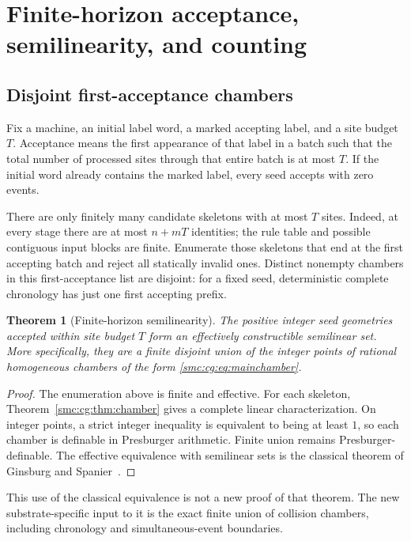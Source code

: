 \documentclass[11pt,letterpaper]{article}
\numberwithin{equation}{section}
\newtheorem{theorem}{Theorem}[section]
\theoremstyle{definition}
\theoremstyle{remark}
\begin{document}
\section{Finite-horizon acceptance, semilinearity, and counting}
\label{smc:cg:sec:counting}

\subsection{Disjoint first-acceptance chambers}

Fix a machine, an initial label word, a marked accepting label, and a site
budget $T$. Acceptance means the first appearance of that label in a batch
such that the total number of processed sites through that entire batch is
at most $T$. If the initial word already contains the marked label, every
seed accepts with zero events.

There are only finitely many candidate skeletons with at most $T$ sites.
Indeed, at every stage there are at most $n+mT$ identities; the rule table
and possible contiguous input blocks are finite. Enumerate those skeletons
that end at the first accepting batch and reject all statically invalid
ones. Distinct nonempty chambers in this first-acceptance list are disjoint:
for a fixed seed, deterministic complete chronology has just one first
accepting prefix.

\begin{theorem}[Finite-horizon semilinearity]
\label{smc:cg:thm:semilinear}
The positive integer seed geometries accepted within site budget $T$ form
an effectively constructible semilinear set. More specifically, they are a
finite disjoint union of the integer points of rational homogeneous
chambers of the form \eqref{smc:cg:eq:mainchamber}.
\end{theorem}
\begin{proof}
The enumeration above is finite and effective. For each skeleton,
Theorem~\ref{smc:cg:thm:chamber} gives a complete linear characterization. On integer
points, a strict integer inequality is equivalent to being at least $1$,
so each chamber is definable in Presburger arithmetic. Finite union remains
Presburger-definable. The effective equivalence with semilinear sets is the
classical theorem of Ginsburg and Spanier~\cite{ginsburgspanier}.
\end{proof}

This use of the classical equivalence is not a new proof of that theorem.
The new substrate-specific input to it is the exact finite union of
collision chambers, including chronology and simultaneous-event boundaries.
\end{document}
